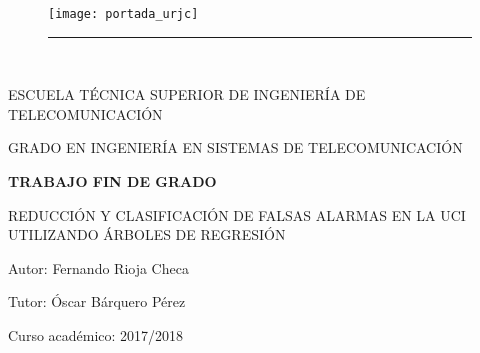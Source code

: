 \begin{titlepage}
	\begin{center}
	\vspace*{-1in}
	\begin{figure}
		\begin{center}
			\texttt{[image: portada\_urjc]}
			\vspace*{1cm}
			\rule{100mm}{0.1mm}\\

		\end{center}
	\end{figure}
	\begin{large}
			\vspace*{1cm}
			ESCUELA TÉCNICA SUPERIOR DE INGENIERÍA DE TELECOMUNICACIÓN\\
	\end{large}
	\vspace*{2cm}
	\begin{large}
		GRADO EN INGENIERÍA EN SISTEMAS DE TELECOMUNICACIÓN\\
	\end{large}
	\vspace*{2cm}
	\begin{large}
		\textbf{TRABAJO FIN DE GRADO}\\
	\end{large}
	\vspace*{2cm}
	\begin{large}
		REDUCCIÓN Y CLASIFICACIÓN DE FALSAS ALARMAS EN LA UCI UTILIZANDO ÁRBOLES DE REGRESIÓN\\
	\end{large}
	\vspace*{2cm}
	\begin{large}
		Autor: Fernando Rioja Checa\\
	\end{large}
	\vspace*{0.5cm}
	\begin{large}
		Tutor: Óscar Bárquero Pérez\\
	\end{large}
	\vspace*{2cm}
	\begin{large}
		Curso académico: 2017/2018\\
	\end{large}
	\end{center}
\end{titlepage}
